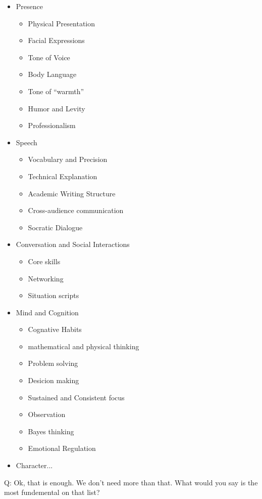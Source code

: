 \begin{itemize}
  \item Presence
  \begin{itemize}
    \item Physical Presentation
    \item Facial Expressions
    \item Tone of Voice
    \item Body Language
    \item Tone of ``warmth''
    \item Humor and Levity
    \item Professionalism
  \end{itemize}
  \item Speech
  \begin{itemize}
    \item Vocabulary and Precision
    \item Technical Explanation
    \item Academic Writing Structure
    \item Cross-audience communication
    \item Socratic Dialogue
  \end{itemize}
  \item Conversation and Social Interactions
  \begin{itemize}
    \item Core skills
    \item Networking
    \item Situation scripts
  \end{itemize}
  \item Mind and Cognition
  \begin{itemize}
    \item Cognative Habits
    \item mathematical and physical thinking
    \item Problem solving
    \item Desicion making
    \item Sustained and Consistent focus
    \item Observation
    \item Bayes thinking
    \item Emotional Regulation
  \end{itemize}
  \item Character...
\end{itemize}

Q: Ok, that is enough. We don't need more than that. What would you say is the most fundemental on that list?


